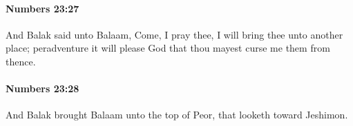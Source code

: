 		\paragraph{Numbers 23:27} %
			\label{NUMBERS-23-27}

			And Balak said unto Balaam, Come, I pray thee, I will bring thee unto another place; peradventure it will please God that thou mayest curse me them from thence.


		\paragraph{Numbers 23:28} %
			\label{NUMBERS-23-28}

			And Balak brought Balaam unto the top of Peor, that looketh toward Jeshimon.


